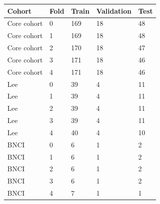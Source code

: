 \begin{tabular}{lllll}
\toprule
Cohort & Fold & Train & Validation & Test \\
\midrule
Core cohort & 0 & 169 & 18 & 48 \\
Core cohort & 1 & 169 & 18 & 48 \\
Core cohort & 2 & 170 & 18 & 47 \\
Core cohort & 3 & 171 & 18 & 46 \\
Core cohort & 4 & 171 & 18 & 46 \\
Lee & 0 & 39 & 4 & 11 \\
Lee & 1 & 39 & 4 & 11 \\
Lee & 2 & 39 & 4 & 11 \\
Lee & 3 & 39 & 4 & 11 \\
Lee & 4 & 40 & 4 & 10 \\
BNCI & 0 & 6 & 1 & 2 \\
BNCI & 1 & 6 & 1 & 2 \\
BNCI & 2 & 6 & 1 & 2 \\
BNCI & 3 & 6 & 1 & 2 \\
BNCI & 4 & 7 & 1 & 1 \\
\bottomrule
\end{tabular}
